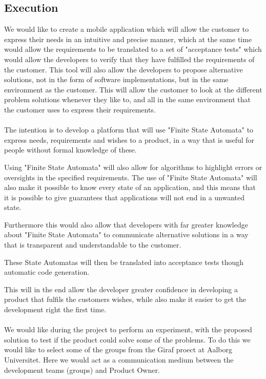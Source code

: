 \subsection{Execution}
We would like to create a mobile application which will allow the customer to express their needs in an intuitive and precise manner, which at the same time would allow the requirements to be translated to a set of "acceptance tests" which would allow the developers to verify that they have fulfilled the requirements of the customer.
This tool will also allow the developers to propose alternative solutions, not in the form of software implementations, but in the same environment as the customer. 
This will allow the customer to look at the different problem solutions whenever they like to, and all in the same environment that the customer uses to express their requirements. 
\\\\
The intention is to develop a platform that will use "Finite State Automata" to express needs, requirements and wishes to a product, in a way that is useful for people without formal knowledge of these. 

Using "Finite State Automata" will also allow for algorithms to highlight errors or oversights in the specified requirements.
The use of "Finite State Automata" will also make it possible to know every state of an application, and this means that it is possible to give guarantees that applications will not end in a unwanted state. 

Furthermore this would also allow that developers with far greater knowledge about "Finite State Automata" to communicate alternative solutions in a way that is transparent and understandable to the customer. 

These State Automatas will then be translated into acceptance tests though automatic code generation.

This will in the end allow the developer greater confidence in developing a product that fulfils the customers wishes, while also make it easier to get the development right the first time.
\\\\
We would like during the project to perform an experiment, with the proposed solution to test if the product could solve some of the problems.
To do this we would like to select some of the groups from the Giraf proect at Aalborg Universitet. 
Here we would act as a communication medium between the development teams (groups) and Product Owner.

